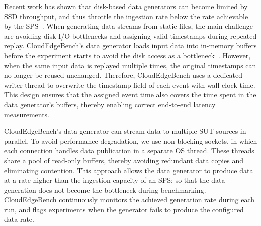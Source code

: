 \documentclass[runningheads]{llncs}
\begin{document}
Recent work has shown that disk-based data generators can become limited by SSD throughput, and thus throttle the ingestion rate below the rate achievable by the SPS~\cite{karimov2018}.
When generating data streams from static files, the main challenge are avoiding disk I/O bottlenecks and assigning valid timestamps during repeated replay. 
CloudEdgeBench's data generator loads input data into in-memory buffers before the experiment starts to avoid the disk access as a bottleneck~\cite{annihilator-datagen}. 
However, when the same input data is replayed multiple times, the original timestamps can no longer be reused unchanged.
Therefore, CloudEdgeBench uses a dedicated writer thread to overwrite the timestamp field of each event with wall-clock time. 
This design ensures that the assigned event time also covers the time spent in the data generator's buffers, thereby enabling correct end-to-end latency measurements.

CloudEdgeBench's data generator can stream data to multiple SUT sources in parallel.
To avoid performance degradation, we use non-blocking sockets, in which each connection handles data publication in a separate OS thread.
These threads share a pool of read-only buffers, thereby avoiding redundant data copies and eliminating contention.
This approach allows the data generator to produce data at a rate higher than the ingestion capacity of an SPS; so that the data generation does not become the bottleneck during benchmarking.
CloudEdgeBench continuously monitors the achieved generation rate during each run, and flags experiments when the generator fails to produce the configured data rate.
\end{document}
